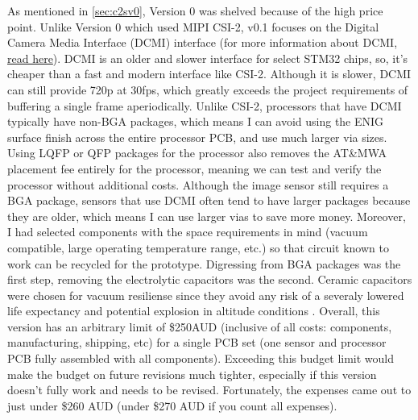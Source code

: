 As mentioned in \autoref{sec:c2sv0}, Version 0 was shelved because of the high price point. Unlike Version 0 which used MIPI CSI-2, v0.1 focuses on the Digital Camera Media Interface (DCMI) interface (for more information about DCMI, \href{https://www.st.com/resource/en/application_note/an5020-introduction-to-digital-camera-interface-dcmi-for-stm32-mcus-stmicroelectronics.pdf}{read here}).
DCMI is an older and slower interface for select STM32 chips, so, it's cheaper than a fast and modern interface like CSI-2. Although it is slower, DCMI can still provide 720p at 30fps, which greatly exceeds the project requirements of buffering a single frame aperiodically.
\nl
Unlike CSI-2, processors that have DCMI typically have non-BGA packages, which means I can avoid using the ENIG surface finish across the entire processor PCB, and use much larger via sizes. Using LQFP or QFP packages for the processor also removes the AT\&MWA placement fee entirely for the processor, meaning we can test and verify the processor without additional costs. Although the image sensor still requires a BGA package, sensors that use DCMI often tend to have larger packages because they are older, which means I can use larger vias to save more money. Moreover, I had selected components with the space requirements in mind (vacuum compatible, large operating temperature range, etc.) so that circuit known to work can be recycled for the prototype. Digressing from BGA packages was the first step, removing the electrolytic capacitors was the second. Ceramic capacitors were chosen for vacuum resiliense since they avoid any risk of a severaly lowered life expectancy and potential explosion in altitude conditions \cite{electro-cap-guidelines}.
\nl
Overall, this version has an arbitrary limit of \$250AUD (inclusive of all costs: components, manufacturing, shipping, etc) for a single PCB set (one sensor and processor PCB fully assembled with all components). Exceeding this budget limit would make the budget on future revisions much tighter, especially if this version doesn't fully work and needs to be revised. Fortunately, the expenses came out to just under \$260 AUD (under \$270 AUD if you count all expenses).
